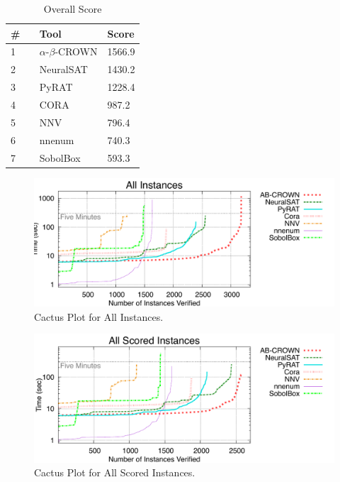 

\begin{table}[h]
\begin{center}
\caption{Overall Score} \label{tab:score}
{\setlength{\tabcolsep}{2pt}
\begin{tabular}[h]{@{}lll@{}}
\toprule
\textbf{\# ~} & \textbf{Tool} & \textbf{Score}\\
\midrule
1 & $\alpha$-$\beta$-CROWN & 1566.9 \\
2 & NeuralSAT & 1430.2 \\
3 & PyRAT & 1228.4 \\
4 & CORA & 987.2 \\
5 & NNV & 796.4 \\
6 & nnenum & 740.3 \\
7 & SobolBox & 593.3 \\
\bottomrule
\end{tabular}
}
\end{center}
\end{table}



\begin{figure}[h]
\centerline{\includegraphics[width=\textwidth]{cactus/all.pdf}}
\caption{Cactus Plot for All Instances.}
\label{fig:quantPic}
\end{figure}


\begin{figure}[h]
\centerline{\includegraphics[width=\textwidth]{cactus/all_scored.pdf}}
\caption{Cactus Plot for All Scored Instances.}
\label{fig:quantPic}
\end{figure}

